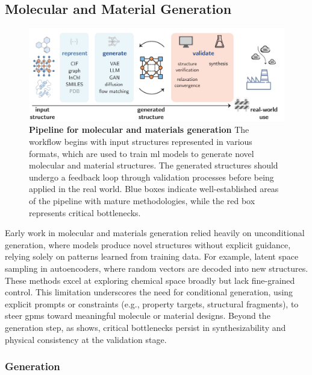 \subsection{Molecular and Material Generation} \label{sec:mol_generation}

\begin{figure}[htbp!]
    \centering
    \includegraphics[width=1\textwidth]{figures/rescaled_figures/chemrev_figure21.pdf}
    \caption{\textbf{Pipeline for molecular and materials generation} The workflow begins with input structures represented in various formats, which are used to train \gls{ml} models to generate novel molecular and material structures. The generated structures should undergo a feedback loop through validation processes before being applied in the real world. Blue boxes indicate well-established areas of the pipeline with mature methodologies, while the red box represents critical bottlenecks.}
    \label{fig:generation}
\end{figure}

\noindent Early work in molecular and materials generation relied heavily on unconditional generation, where models produce novel structures without explicit guidance, relying solely on patterns learned from training data. For example, latent space sampling in autoencoders, where random vectors are decoded into new structures.\autocite{yoshikai2024novel} These methods excel at exploring chemical space broadly but lack fine-grained control. 
This limitation underscores the need for conditional generation, using explicit prompts or constraints (e.g., property targets, structural fragments), to steer \glspl{gpm} toward meaningful molecule or material designs. 
Beyond the generation step, as  shows, critical bottlenecks persist in synthesizability and physical consistency at the validation stage.

\subsubsection{Generation}\label{sec:generation}

